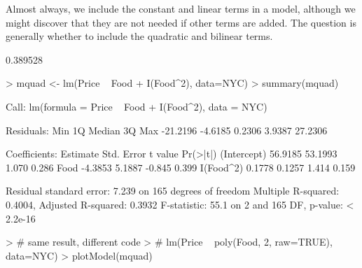 \documentclass[10pt]{article}
\begin{document}

Almost always, we include the constant and linear terms in a model, although we might discover that they are not needed if other terms are added. The question is generally whether to include the quadratic and bilinear terms.

\begin{Schunk}
\begin{Soutput}
[1] 0.389528
\end{Soutput}
\begin{Sinput}
> mquad <- lm(Price ~ Food + I(Food^2), data=NYC)
> summary(mquad)
\end{Sinput}
\begin{Soutput}
Call:
lm(formula = Price ~ Food + I(Food^2), data = NYC)

Residuals:
     Min       1Q   Median       3Q      Max 
-21.2196  -4.6185   0.2306   3.9387  27.2306 

Coefficients:
            Estimate Std. Error t value Pr(>|t|)
(Intercept)  56.9185    53.1993   1.070    0.286
Food         -4.3853     5.1887  -0.845    0.399
I(Food^2)     0.1778     0.1257   1.414    0.159

Residual standard error: 7.239 on 165 degrees of freedom
Multiple R-squared:  0.4004,	Adjusted R-squared:  0.3932 
F-statistic:  55.1 on 2 and 165 DF,  p-value: < 2.2e-16
\end{Soutput}
\begin{Sinput}
> # same result, different code
> # lm(Price ~ poly(Food, 2, raw=TRUE), data=NYC)
> plotModel(mquad)
\end{Sinput}
\end{Schunk}
\end{document}
